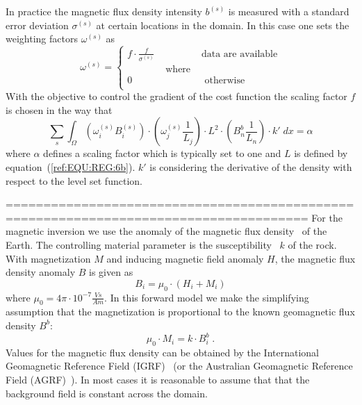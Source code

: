 In practice the magnetic flux density intensity $b^{(s)}$ is measured 
with a standard error deviation $\sigma^{(s)}$ at certain locations in the domain.
In this case one sets the weighting
factors $\omega^{(s)}$ as
\begin{equation}\label{ref:IMAG:EQU:11}
\omega^{(s)} 
= \left\{
\begin{array}{lcl}
f \cdot  \frac{f}{\sigma^{(s)}} & & \mbox{data are available} \\
& \mbox{ where } & \\
0 & & \mbox{ otherwise } \\
\end{array}
\right.
\end{equation} 
With the objective to control the 
gradient of the cost function the scaling factor $f$ is chosen in the way that 
\begin{equation}\label{ref:IMAG:EQU:12}
\sum_{s} \int_{\Omega} ( \omega^{(s)}_i B^{(s)}_i ) 
 \cdot ( \omega^{(s)}_j \frac{1}{L_j} ) \cdot L^2 \cdot
( B^b_n \frac{1}{L_n} )
 \cdot k' \;
 dx =\alpha
\end{equation} 
where $\alpha$ defines a scaling factor which is typically set to one and $L$ is defined by equation~(\ref{ref:EQU:REG:6b}).
$k'$ is considering the 
derivative of the density with respect to the level set function. 


======================================================================================
For the magnetic inversion we use the anomaly of the magnetic flux
density~ of the Earth.
The controlling material parameter is the susceptibility~
$k$ of the rock.
With magnetization $M$ and inducing magnetic field anomaly $H$, the magnetic
flux density anomaly $B$ is given as
\begin{equation}\label{ref:IMAG:EQU:1}
B_i = \mu_0 \cdot ( H_i  + M_i )
\end{equation}
where $\mu_0 = 4 \pi \cdot 10^{-7} \frac{Vs}{Am}$.
In this forward model we make the simplifying assumption that the magnetization
is proportional to the known geomagnetic flux density $B^b$:
\begin{equation}\label{ref:IMAG:EQU:4}
\mu_0  \cdot M_i = k \cdot B^b_i \;. 
\end{equation}
Values for the magnetic flux density can be obtained by the International
Geomagnetic Reference Field (IGRF)~\cite{IGRF}
(or the Australian Geomagnetic Reference Field (AGRF)~\cite{AGRF}).
In most cases it is reasonable to assume that that the background field is
constant across the domain.

